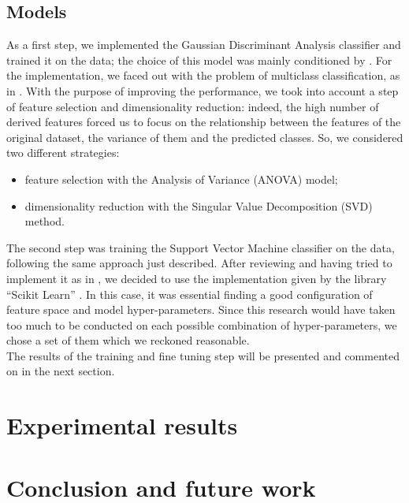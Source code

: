\documentclass[a4paper,10pt,oneside]{article}
\begin{document}
\subsection{Models}
As a first step, we implemented the Gaussian Discriminant Analysis classifier and trained it on the data; the choice of this model was mainly conditioned by \cite{brown2013activity}. For the implementation, we faced out with the problem of multiclass classification, as in \cite{guillame2020}. With the purpose of improving the performance, we took into account a step of feature selection and dimensionality reduction: indeed, the high number of derived features forced us to focus on the relationship between the features of the original dataset, the variance of them and the predicted classes. So, we considered two different strategies:
\begin{itemize}
 \item feature selection with the Analysis of Variance (ANOVA) model;
 \item dimensionality reduction with the Singular Value Decomposition (SVD) method.
\end{itemize}
The second step was training the Support Vector Machine classifier on the data, following the same approach just described. After reviewing \cite{james2013introduction, aggarwal2015data, ma_ng_re_2009} and having tried to implement it as in \cite{platt1998sequential, kowalczyk2017support}, we decided to use the implementation given by the library “Scikit Learn” \cite{scikit-learn, sklearn_api}. In this case, it was essential finding a good configuration of feature space and model hyper-parameters. Since this research would have taken too much to be conducted on each possible combination of hyper-parameters, we chose a set of them which we reckoned reasonable.\\ The results of the training and fine tuning step will be presented and commented on in the next section.

\section{Experimental results}

\section{Conclusion and future work}



\end{document}
